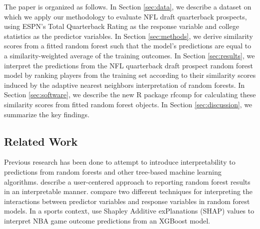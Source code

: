\documentclass{article}
\begin{document}
The paper is organized as follows. In Section \ref{sec:data}, we describe a dataset on which we apply our methodology to evaluate NFL draft quarterback prospects, using ESPN's Total Quarterback Rating as the response variable and college statistics as the predictor variables. In Section \ref{sec:methods}, we derive similarity scores from a fitted random forest such that the model's predictions are equal to a similarity-weighted average of the training outcomes. In Section \ref{sec:results}, we interpret the predictions from the NFL quarterback draft prospect random forest model by ranking players from the training set according to their similarity scores induced by the adaptive nearest neighbors interpretation of random forests. In Section \ref{sec:software}, we describe the new R package rfcomp for calculating these similarity scores from fitted random forest objects. In Section \ref{sec:discussion}, we summarize the key findings.

\subsection{Related Work}

Previous research has been done to attempt to introduce interpretability to predictions from random forests and other tree-based machine learning algorithms. \citet{petkovic_improving_2018} describe a user-centered approach to reporting random forest results in an interpretable manner. \citet{aria_comparison_2021} compare two different techniques for interpreting the interactions between predictor variables and response variables in random forest models. In a sports context, \citet{ouyang_integration_2024} use Shapley Additive exPlanations (SHAP) values to interpret NBA game outcome predictions from an XGBoost model.
\end{document}
